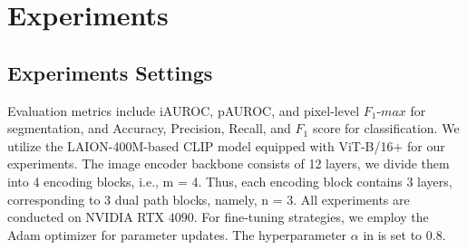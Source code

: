 \section{Experiments}
\label{sec:experiments}


\subsection{Experiments Settings}
\label{sec:experiments-settings}



Evaluation metrics include iAUROC, pAUROC, and pixel-level $F_{1}$-$max$ for segmentation, and Accuracy, Precision, Recall, and $F_{1}$ score for classification.
We utilize the LAION-400M-based CLIP model equipped with ViT-B/16+ for our experiments.  The image encoder backbone consists of 12 layers, we divide them into 4 encoding blocks, i.e., m = 4. Thus, each encoding block contains 3 layers, corresponding to 3 dual path blocks, namely, n = 3.
All experiments are conducted on NVIDIA RTX $4090$. 
For fine-tuning strategies, we employ the Adam optimizer for parameter updates. The hyperparameter $\alpha$ in  is set to $0.8$.

